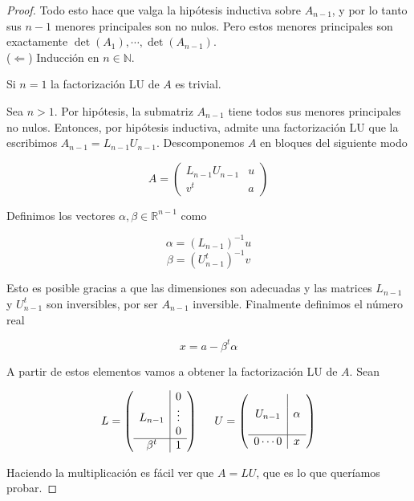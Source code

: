 \begin{propo}
\begin{proof}
Todo esto hace que valga la hipótesis inductiva sobre $A_{n - 1}$, y por lo tanto sus $n - 1$ menores principales son no nulos. Pero estos menores principales son exactamente $\det(A_1), \cdots, \det(A_{n - 1})$.\\[0.25cm]

($\Leftarrow$) Inducción en $n \in \mathbb{N}$.

Si $n = 1$ la factorización LU de $A$ es trivial.

Sea $n > 1$. Por hipótesis, la submatriz $A_{n - 1}$ tiene todos sus menores principales no nulos. Entonces, por hipótesis inductiva, admite una factorización LU que la escribimos $A_{n - 1} = L_{n - 1}U_{n - 1}$. Descomponemos $A$ en bloques del siguiente modo

\[A = \left(\begin{array}{c|c}
L_{n - 1} U_{n - 1} & u\\ \hline
v^t & a
\end{array}\right)\]

Definimos los vectores $\alpha, \beta \in \mathbb{R}^{n - 1}$ como

\[\alpha = (L_{n - 1})^{-1}u\]
\[\beta = (U_{n - 1}^t)^{-1} v\]

Esto es posible gracias a que las dimensiones son adecuadas y las matrices $L_{n - 1}$ y $U_{n - 1}^t$ son inversibles, por ser $A_{n - 1}$ inversible. Finalmente definimos el número real

\[x = a - \beta^t \alpha\]

A partir de estos elementos vamos a obtener la factorización LU de $A$. Sean

\[
L = \left(\begin{array}{c|c}
 & 0 \\
L_{n - 1} & \vdots \\
 & 0 \\ \hline
\beta^t & 1
\end{array}\right)
\hspace{0.5cm}
U = \left(\begin{array}{c|c}
 &  \\
U_{n - 1} & \alpha \\
 &  \\ \hline
0 \cdots 0 & x
\end{array}\right)\]

Haciendo la multiplicación es fácil ver que $A = LU$, que es lo que queríamos probar.

\end{proof}
\end{propo}

